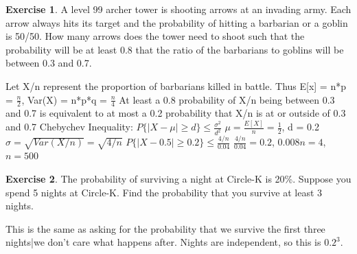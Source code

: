 \documentclass[12pt]{amsart}
\theoremstyle{definition}
\newtheorem{exercise}{Exercise}
\numberwithin{equation}{section}
\theoremstyle{plain}
\begin{document}
 


 
\begin{exercise}
A level 99 archer tower is shooting arrows at an invading army. Each arrow always hits its target and the probability of hitting a barbarian or a goblin is 50/50. How many arrows does the tower need to shoot such that the probability will be at least 0.8 that the ratio of the barbarians to goblins will be between 0.3 and 0.7.
\begin{answer}
Let X/n represent the proportion of barbarians killed in battle. Thus E[x] = n*p = $\frac{n}{2}$, Var(X) = n*p*q = $\frac{n}{4}$
\newline
At least a 0.8 probability of X/n being between 0.3 and 0.7 is equivalent to at most a 0.2 probability that X/n is at or outside of 0.3 and 0.7
\newline
Chebychev Inequality: $P\{|X-\mu| \geq d\} \leq \frac{\sigma^2}{d^2}$
\newline
$\mu = \frac{E[X]}{n} = \frac{1}{2}$, d = 0.2
\newline
$\sigma = \sqrt{Var(X/n)} = \sqrt{4/n}$
\newline
$P\{|X-0.5| \geq 0.2\} \leq \frac{4/n}{0.04}$
\newline
$\frac{4/n}{0.04} = 0.2$, $0.008n = 4$, $n=500$
\end{answer}
\end{exercise}


 

\begin{exercise}
The probability of surviving a night at Circle-K is 20\%. Suppose you spend 5 nights at Circle-K. Find the probability that you survive at least 3 nights.
\begin{answer}
    This is the same as asking for the probability that we survive the first three nights|we don't care what happens after. Nights are independent, so this is $0.2^3$.
\end{answer}
\end{exercise}

 
\end{document}
